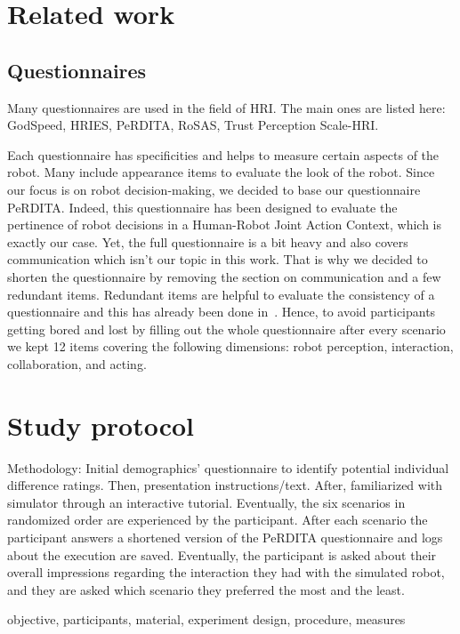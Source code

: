\section{Related work}

\subsection{Questionnaires}
Many questionnaires are used in the field of HRI. The main ones are listed here: GodSpeed, HRIES, PeRDITA, RoSAS, Trust Perception Scale-HRI. 

Each questionnaire has specificities and helps to measure certain aspects of the robot. Many include appearance items to evaluate the look of the robot. Since our focus is on robot decision-making, we decided to base our questionnaire PeRDITA. Indeed, this questionnaire has been designed to evaluate the pertinence of robot decisions in a Human-Robot Joint Action Context, which is exactly our case. Yet, the full questionnaire is a bit heavy and also covers communication which isn't our topic in this work. 
That is why we decided to shorten the questionnaire by removing the section on communication and a few redundant items. Redundant items are helpful to evaluate the consistency of a questionnaire and this has already been done in~\cite{devin_evaluating_2018}. Hence, to avoid participants getting bored and lost by filling out the whole questionnaire after every scenario we kept 12 items covering the following dimensions: robot perception, interaction, collaboration, and acting.



\section{Study protocol}

Methodology: 
Initial demographics' questionnaire to identify potential individual difference ratings. Then, presentation instructions/text. After, familiarized with simulator through an interactive tutorial. Eventually, the six scenarios in randomized order are experienced by the participant. After each scenario the participant answers a shortened version of the PeRDITA questionnaire and logs about the execution are saved. Eventually, the participant is asked about their overall impressions regarding the interaction they had with the simulated robot, and they are asked which scenario they preferred the most and the least. 

objective, participants, material, experiment design, procedure, measures

